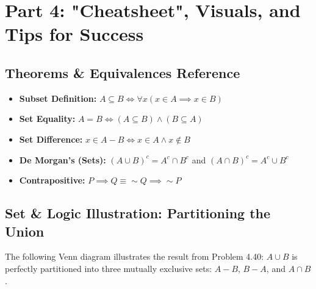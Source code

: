 \documentclass[11pt]{article}
\theoremstyle{definition}
\theoremstyle{remark}
\begin{document}
\newpage
\section{Part 4: "Cheatsheet", Visuals, and Tips for Success}

\subsection{Theorems \& Equivalences Reference}
\begin{itemize}
    \item \textbf{Subset Definition:} $A \subseteq B \iff \forall x (x \in A \implies x \in B)$
    \item \textbf{Set Equality:} $A = B \iff (A \subseteq B) \land (B \subseteq A)$
    \item \textbf{Set Difference:} $x \in A - B \iff x \in A \land x \notin B$
    \item \textbf{De Morgan's (Sets):} $(A \cup B)^c = A^c \cap B^c$ and $(A \cap B)^c = A^c \cup B^c$
    \item \textbf{Contrapositive:} $P \implies Q \equiv \sim Q \implies \sim P$
\end{itemize}

\subsection{Set \& Logic Illustration: Partitioning the Union}
The following Venn diagram illustrates the result from Problem 4.40: $A \cup B$ is perfectly partitioned into three mutually exclusive sets: $A - B$, $B - A$, and $A \cap B$.

\begin{center}
\end{center}
\end{document}
